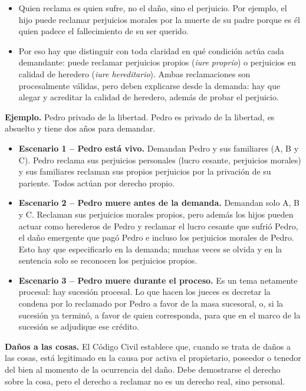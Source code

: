 \begin{itemize}
\item Quien reclama es quien sufre, no el daño, sino el perjuicio. Por ejemplo, el hijo puede reclamar perjuicios morales por la muerte de su padre porque es él quien padece el fallecimiento de su ser querido.
\item Por eso hay que distinguir con toda claridad en qué condición actúa cada demandante: puede reclamar perjuicios propios (\textit{iure proprio}) o perjuicios en calidad de heredero (\textit{iure hereditario}). Ambas reclamaciones son procesalmente válidas, pero deben explicarse desde la demanda: hay que alegar y acreditar la calidad de heredero, además de probar el perjuicio.
\end{itemize}
\begin{ejemplo}
\textcolor[HTML]{4F6228}{\textbf{Ejemplo. }}Pedro privado de la libertad. Pedro es privado de la libertad, es absuelto y tiene dos años para demandar.
\end{ejemplo}
\begin{itemize}
\item \textbf{Escenario 1 – Pedro está vivo.} Demandan Pedro y sus familiares (A, B y C). Pedro reclama sus perjuicios personales (lucro cesante, perjuicios morales) y sus familiares reclaman sus propios perjuicios por la privación de su pariente. Todos actúan por derecho propio.
\item \textbf{Escenario 2 – Pedro muere antes de la demanda.} Demandan solo A, B y C. Reclaman sus perjuicios morales propios, pero además los hijos pueden actuar como herederos de Pedro y reclamar el lucro cesante que sufrió Pedro, el daño emergente que pagó Pedro e incluso los perjuicios morales de Pedro. Esto hay que especificarlo en la demanda; muchas veces se olvida y en la sentencia solo se reconocen los perjuicios propios.
\item \textbf{Escenario 3 – Pedro muere durante el proceso.} Es un tema netamente procesal: hay sucesión procesal. Lo que hacen los jueces es decretar la condena por lo reclamado por Pedro a favor de la masa sucesoral, o, si la sucesión ya terminó, a favor de quien corresponda, para que en el marco de la sucesión se adjudique ese crédito.
\end{itemize}
\textbf{Daños a las cosas.} El Código Civil establece que, cuando se trata de daños a las cosas, está legitimado en la causa por activa el propietario, poseedor o tenedor del bien al momento de la ocurrencia del daño. Debe demostrarse el derecho sobre la cosa, pero el derecho a reclamar no es un derecho real, sino personal.

